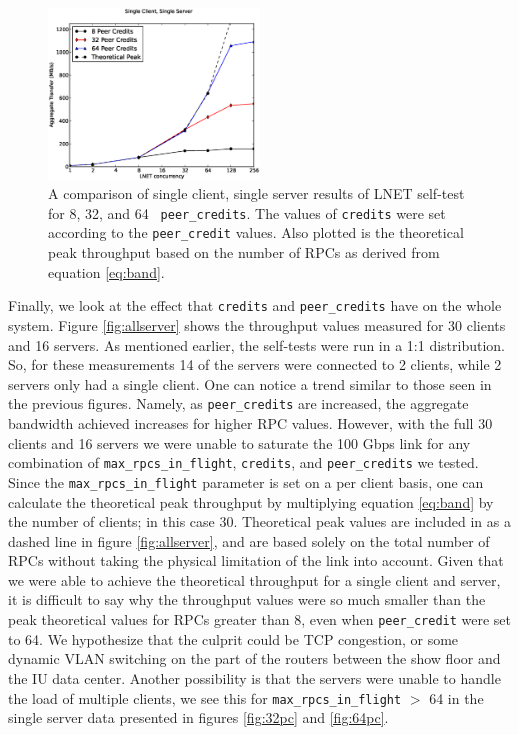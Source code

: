 \documentclass[]{sigplan-proc}
\begin{document}
\begin{figure}
\centering
\includegraphics[width=0.50\textwidth]{figures/ss_plot.eps}
\caption{A comparison of single client, single server results of LNET self-test for 8, 32, and 64 {\tt
    peer\_credits}. The values of {\tt credits} were set according to the {\tt peer\_credit} values. Also
  plotted is the theoretical peak throughput based on the number of RPCs as derived from equation \ref{eq:band}.}
\label{fig:singleserver}
\end{figure}

Finally, we look at the effect that {\tt credits} and {\tt peer\_credits} have on the whole system. Figure
\ref{fig:allserver} shows the throughput values measured for 30 clients and 16 servers. As mentioned earlier,
the self-tests were run in a 1:1 distribution. So, for these measurements 14 of the servers were connected to
2 clients, while 2 servers only had a single client. One can notice a trend similar to those seen in the
previous figures. Namely, as {\tt peer\_credits} are increased, the aggregate bandwidth achieved increases for
higher RPC values. However, with the full 30 clients and 16 servers we were unable to saturate the 100 Gbps
link for any combination of {\tt max\_rpcs\_in\_flight}, {\tt credits}, and {\tt peer\_credits} we tested. Since the {\tt max\_rpcs\_in\_flight} parameter is set on a per client basis, one can
calculate the theoretical peak throughput by multiplying equation \ref{eq:band} by the number of clients; in
this case 30. Theoretical peak values are included in as a dashed line in figure \ref{fig:allserver}, and are
based solely on the total number of RPCs without taking the physical limitation of the link into
account. Given that we were able to achieve the theoretical throughput for a single client and server, it is
difficult to say why the throughput values were so much smaller than the peak theoretical values for RPCs
greater than 8, even when {\tt peer\_credit} were set to 64. We hypothesize that the culprit could be TCP
congestion, or some dynamic VLAN switching on the part of the routers between the show floor and the IU data
center. Another possibility is that the servers were unable to handle the load of multiple clients, we see
this for {\tt max\_rpcs\_in\_flight} $>$ 64 in the single server data presented in figures \ref{fig:32pc} and \ref{fig:64pc}.  
\end{document}
